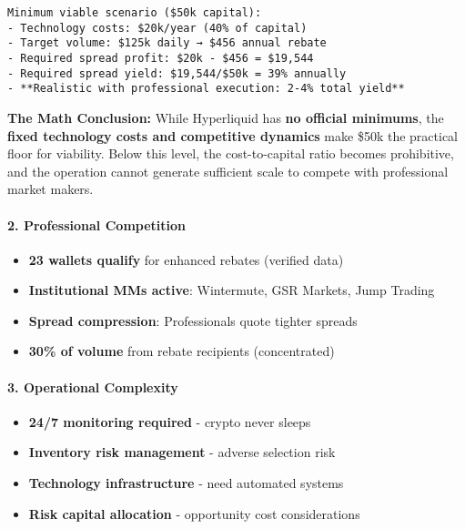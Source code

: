 \begin{verbatim}
Minimum viable scenario ($50k capital):
- Technology costs: $20k/year (40% of capital)
- Target volume: $125k daily → $456 annual rebate
- Required spread profit: $20k - $456 = $19,544
- Required spread yield: $19,544/$50k = 39% annually
- **Realistic with professional execution: 2-4% total yield**
\end{verbatim}

\textbf{The Math Conclusion:} While Hyperliquid has \textbf{no official
minimums}, the \textbf{fixed technology costs and competitive dynamics}
make \$50k the practical floor for viability. Below this level, the
cost-to-capital ratio becomes prohibitive, and the operation cannot
generate sufficient scale to compete with professional market makers.

\hypertarget{professional-competition}{%
\paragraph{\texorpdfstring{2. \textbf{Professional
Competition}}{2. Professional Competition}}\label{professional-competition}}

\begin{itemize}
\tightlist
\item
  \textbf{23 wallets qualify} for enhanced rebates (verified data)
\item
  \textbf{Institutional MMs active}: Wintermute, GSR Markets, Jump
  Trading
\item
  \textbf{Spread compression}: Professionals quote tighter spreads
\item
  \textbf{30\% of volume} from rebate recipients (concentrated)
\end{itemize}

\hypertarget{operational-complexity}{%
\paragraph{\texorpdfstring{3. \textbf{Operational
Complexity}}{3. Operational Complexity}}\label{operational-complexity}}

\begin{itemize}
\tightlist
\item
  \textbf{24/7 monitoring required} - crypto never sleeps
\item
  \textbf{Inventory risk management} - adverse selection risk
\item
  \textbf{Technology infrastructure} - need automated systems
\item
  \textbf{Risk capital allocation} - opportunity cost considerations
\end{itemize}

